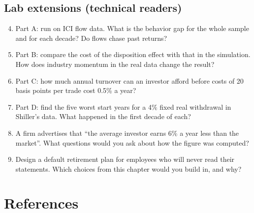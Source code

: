 \subsection*{Lab extensions (technical readers)}

\begin{enumerate}
  \setcounter{enumi}{3}
  \item Part A: run on ICI flow data. What is the behavior gap for the whole sample and for each decade? Do flows chase past returns?
  \item Part B: compare the cost of the disposition effect with that in the simulation. How does industry momentum in the real data change the result?
  \item Part C: how much annual turnover can an investor afford before costs of 20 basis points per trade cost 0.5\% a year?
  \item Part D: find the five worst start years for a 4\% fixed real withdrawal in Shiller's data. What happened in the first decade of each?
  \item A firm advertises that ``the average investor earns 6\% a year less than the market''. What questions would you ask about how the figure was computed?
  \item Design a default retirement plan for employees who will never read their statements. Which choices from this chapter would you build in, and why?
\end{enumerate}

\section*{References}

